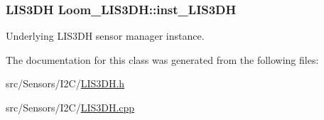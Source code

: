 \subsubsection[{\texorpdfstring{inst\+\_\+\+L\+I\+S3\+DH}{inst_LIS3DH}}]{\setlength{\rightskip}{0pt plus 5cm}L\+I\+S3\+DH Loom\+\_\+\+L\+I\+S3\+D\+H\+::inst\+\_\+\+L\+I\+S3\+DH\hspace{0.3cm}{\ttfamily [protected]}}\hypertarget{class_loom___l_i_s3_d_h_a1f063e7cac82509ec31e9d5e0715db1f}{}\label{class_loom___l_i_s3_d_h_a1f063e7cac82509ec31e9d5e0715db1f}


Underlying L\+I\+S3\+DH sensor manager instance. 



The documentation for this class was generated from the following files\+:\begin{DoxyCompactItemize}
\item 
src/\+Sensors/\+I2\+C/\hyperlink{_l_i_s3_d_h_8h}{L\+I\+S3\+D\+H.\+h}\item 
src/\+Sensors/\+I2\+C/\hyperlink{_l_i_s3_d_h_8cpp}{L\+I\+S3\+D\+H.\+cpp}\end{DoxyCompactItemize}
